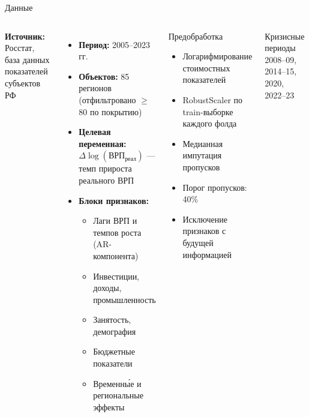 \documentclass[aspectratio=169,10pt]{beamer}
\begin{document}
\begin{frame}{Данные}
\begin{columns}[T]
\textbf{Источник:} Росстат, база данных показателей субъектов РФ
\medskip
\begin{itemize}\setlength\itemsep{4pt}
  \item \textbf{Период:} 2005–2023 гг.
  \item \textbf{Объектов:} 85 регионов (отфильтровано $\geq$80 по покрытию)
  \item \textbf{Целевая переменная:} $\Delta \log(\text{ВРП}_{\text{реал}})$ — темп прироста реального ВРП
  \item \textbf{Блоки признаков:}
  \begin{itemize}
    \item Лаги ВРП и темпов роста (AR-компонента)
    \item Инвестиции, доходы, промышленность
    \item Занятость, демография
    \item Бюджетные показатели
    \item Временны́е и региональные эффекты
  \end{itemize}
\end{itemize}
\begin{block}{Предобработка}
\begin{itemize}\setlength\itemsep{3pt}
  \item Логарифмирование стоимостных показателей
  \item RobustScaler по train-выборке каждого фолда
  \item Медианная импутация пропусков
  \item Порог пропусков: 40\%
  \item Исключение признаков с будущей информацией
\end{itemize}
\end{block}
\begin{block}{Кризисные периоды}
\small 2008–09, 2014–15, 2020, 2022–23
\end{block}
\end{columns}
\end{frame}
\end{document}
